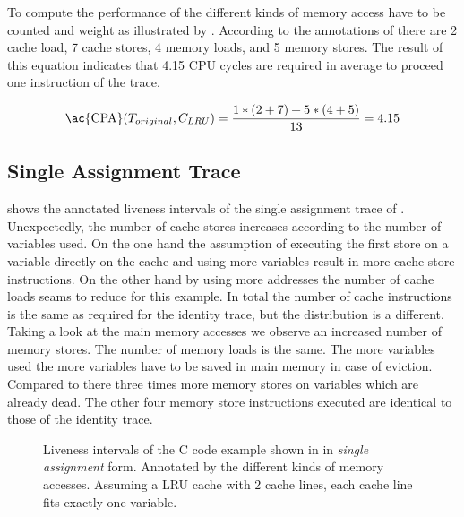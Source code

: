 \documentclass[onecolumn, openright, master, english, signatures]{dbrgrptt}
\begin{document}
To compute the performance of  the different kinds of memory access have to be counted and weight as illustrated by . According to the annotations of  there are 2 cache load, 7 cache stores, 4 memory loads, and 5 memory stores. The result of this equation indicates that 4.15 \ac{CPU} cycles are required in average to proceed one instruction of the \ac{trace}.

\begin{equation}\label{equ:trace-transformation-original-marked}
\text{\ac{CPA}}(T_{original}, C_{LRU}) = \frac{1 * (2 + 7) + 5 * (4 + 5)}{13} = 4.15
\end{equation}

\subsection{Single Assignment Trace}
 shows the annotated liveness intervals of the single assignment trace of . Unexpectedly, the number of cache stores increases according to the number of variables used. On the one hand the assumption of executing the first store on a variable directly on the cache and using more variables result in more cache store instructions. On the other hand by using more addresses the number of cache loads seams to reduce for this example. In total the number of cache instructions is the same as required for the identity \ac{trace}, but the distribution is a different. Taking a look at the main memory accesses we observe an increased number of memory stores. The number of memory loads is the same. The more variables used the more variables have to be saved in main memory in case of eviction. Compared to  there three times more memory stores on variables which are already dead. The other four memory store instructions executed are identical to those of the identity \ac{trace}.

\begin{figure}
  \centering
  
  \caption{Liveness intervals of the C code example shown in  in \emph{single assignment} form. Annotated by the different kinds of memory accesses. Assuming a LRU cache with 2 cache lines, each cache line fits exactly one variable.}
  \label{fig:trace-transformation-sa-marked}
\end{figure}
\end{document}
